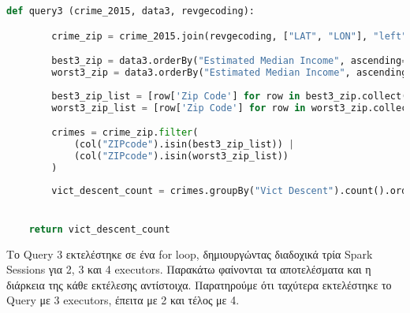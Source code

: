 \documentclass{article}
\begin{document}
\begin{lstlisting}[language = Python]
    def query3 (crime_2015, data3, revgecoding):

        crime_zip = crime_2015.join(revgecoding, ["LAT", "LON"], "left")

        best3_zip = data3.orderBy("Estimated Median Income", ascending=False).limit(3)
        worst3_zip = data3.orderBy("Estimated Median Income", ascending=True).limit(3)
        
        best3_zip_list = [row['Zip Code'] for row in best3_zip.collect()] 
        worst3_zip_list = [row['Zip Code'] for row in worst3_zip.collect()]

        crimes = crime_zip.filter(
            (col("ZIPcode").isin(best3_zip_list)) | 
            (col("ZIPcode").isin(worst3_zip_list))
        )
        
        vict_descent_count = crimes.groupBy("Vict Descent").count().orderBy("count", ascending=False)


    return vict_descent_count
\end{lstlisting}

\vspace{3\baselineskip}

Το Query 3 εκτελέστηκε σε ένα for loop, δημιουργώντας διαδοχικά τρία Spark Sessions για 2, 3 και 4 executors. Παρακάτω φαίνονται τα αποτελέσματα και η διάρκεια της κάθε εκτέλεσης αντίστοιχα. 
Παρατηρούμε ότι ταχύτερα εκτελέστηκε το Query με 3 executors, έπειτα με 2 και τέλος με 4. \\
\end{document}
